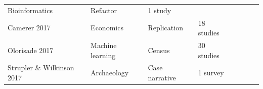 \documentclass{drexelthesis}
\begin{document}
\begin{table}[H]
\begin{adjustbox}{max width=\textwidth}
\begin{tabular}{p{3.86cm}p{4.12cm}p{4.29cm}p{4.24cm}p{3.86cm}p{4.12cm}p{4.29cm}p{4.24cm}}
\multicolumn{1}{p{4.12cm}}{Bioinformatics} & 
\multicolumn{1}{p{4.29cm}}{Refactor} & 
\multicolumn{1}{p{4.24cm}}{1 study} \\ 
\multicolumn{1}{p{3.86cm}}{Camerer 2017 \cite{Camerer2016-tr}} & 
\multicolumn{1}{p{4.12cm}}{Economics} & 
\multicolumn{1}{p{4.29cm}}{Replication} & 
\multicolumn{1}{p{4.24cm}}{18 studies} \\ 
\multicolumn{1}{p{3.86cm}}{Olorisade 2017 \cite{Olorisade2017-wt}} & 
\multicolumn{1}{p{4.12cm}}{Machine learning} & 
\multicolumn{1}{p{4.29cm}}{Census} & 
\multicolumn{1}{p{4.24cm}}{30 studies} \\ 
\multicolumn{1}{p{3.86cm}}{Strupler $\&$ Wilkinson 2017 \cite{Strupler2017-rm}} & 
\multicolumn{1}{p{4.12cm}}{Archaeology} & 
\multicolumn{1}{p{4.29cm}}{Case narrative} & 
\multicolumn{1}{p{4.24cm}}{1 survey} \\ 
\end{tabular}
\end{adjustbox}
\end{table}
\end{document}
